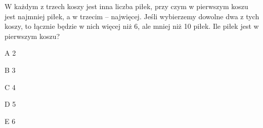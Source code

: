 \begin{tresc}
W każdym z trzech koszy jest inna liczba piłek, przy czym w pierwszym koszu jest najmniej piłek, a w trzecim – najwięcej. Jeśli wybierzemy dowolne dwa z tych koszy, to łącznie będzie w nich więcej niż 6, ale mniej niż 10 piłek. Ile piłek jest w pierwszym koszu?
\end{tresc}
\begin{wariant}{A} 2 \end{wariant}
\begin{wariant}{B} 3 \end{wariant}
\begin{wariant}{C} 4 \end{wariant}
\begin{wariant}{D} 5 \end{wariant}
\begin{wariant}{E} 6 \end{wariant}
